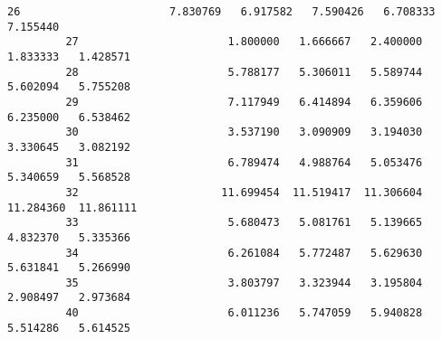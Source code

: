 \documentclass[11pt]{article}
\begin{document}
\begin{Verbatim}[commandchars=\\\{\}]
         26                       7.830769   6.917582   7.590426   6.708333   7.155440   
         27                       1.800000   1.666667   2.400000   1.833333   1.428571   
         28                       5.788177   5.306011   5.589744   5.602094   5.755208   
         29                       7.117949   6.414894   6.359606   6.235000   6.538462   
         30                       3.537190   3.090909   3.194030   3.330645   3.082192   
         31                       6.789474   4.988764   5.053476   5.340659   5.568528   
         32                      11.699454  11.519417  11.306604  11.284360  11.861111   
         33                       5.680473   5.081761   5.139665   4.832370   5.335366   
         34                       6.261084   5.772487   5.629630   5.631841   5.266990   
         35                       3.803797   3.323944   3.195804   2.908497   2.973684   
         40                       6.011236   5.747059   5.940828   5.514286   5.614525   
         

\end{Verbatim}
\end{document}
